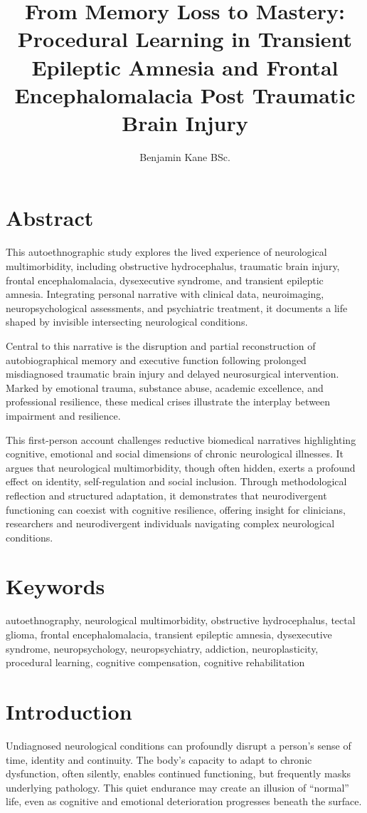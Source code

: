 \documentclass{article}
\title{From Memory Loss to Mastery: Procedural Learning in Transient Epileptic Amnesia and Frontal Encephalomalacia Post Traumatic Brain Injury}
\author{Benjamin Kane BSc.}
\begin{document}
\maketitle

\section*{Abstract}
This autoethnographic study explores the lived experience of neurological multimorbidity, including obstructive hydrocephalus, traumatic brain injury, frontal encephalomalacia, dysexecutive syndrome, and transient epileptic amnesia. Integrating personal narrative with clinical data, neuroimaging, neuropsychological assessments, and psychiatric treatment, it documents a life shaped by invisible intersecting neurological conditions.

Central to this narrative is the disruption and partial reconstruction of autobiographical memory and executive function following prolonged misdiagnosed traumatic brain injury and delayed neurosurgical intervention. Marked by emotional trauma, substance abuse, academic excellence, and professional resilience, these medical crises illustrate the interplay between impairment and resilience.

This first-person account challenges reductive biomedical narratives highlighting cognitive, emotional and social dimensions of chronic neurological illnesses. It argues that neurological multimorbidity, though often hidden, exerts a profound effect on identity, self-regulation and social inclusion. Through methodological reflection and structured adaptation, it demonstrates that neurodivergent functioning can coexist with cognitive resilience, offering insight for clinicians, researchers and neurodivergent individuals navigating complex neurological conditions.

\section*{Keywords}
autoethnography, neurological multimorbidity, obstructive hydrocephalus, tectal glioma, frontal encephalomalacia, transient epileptic amnesia, dysexecutive syndrome, neuropsychology, neuropsychiatry, addiction, neuroplasticity, procedural learning, cognitive compensation, cognitive rehabilitation

\section*{Introduction}
Undiagnosed neurological conditions can profoundly disrupt a person’s sense of time, identity and continuity. The body’s capacity to adapt to chronic dysfunction, often silently, enables continued functioning, but frequently masks underlying pathology. This quiet endurance may create an illusion of “normal” life, even as cognitive and emotional deterioration progresses beneath the surface.
\end{document}
